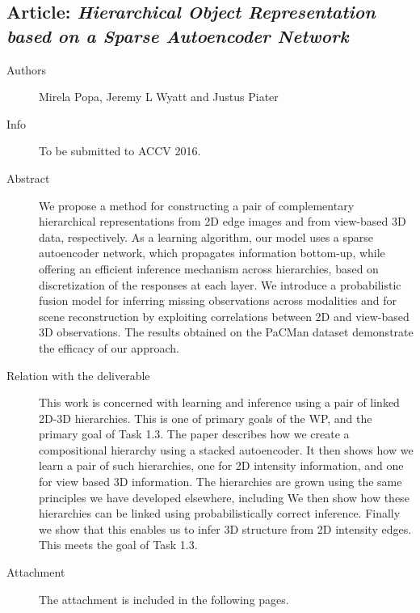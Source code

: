 \documentclass[a4paper,11pt,pdf]{../templates/pacmanreport}
\begin{document}
\subsection{Article: \em Hierarchical Object Representation based on a Sparse Autoencoder Network}
\begin{description}
    \item[Authors] Mirela Popa, Jeremy L Wyatt and Justus Piater
    \item[Info] To be submitted to ACCV 2016.
    \item[Abstract] We propose a method for constructing a pair of complementary
hierarchical representations from 2D edge images and from view-based 3D
data, respectively.  As a learning algorithm, our model uses a sparse
autoencoder network, which propagates information bottom-up, while
offering an efficient inference mechanism across hierarchies, based on
discretization of the responses at each layer.  We introduce a
probabilistic fusion model for inferring missing observations across
modalities and for scene reconstruction by exploiting correlations
between 2D and view-based 3D observations. The results obtained on the
PaCMan dataset demonstrate the efficacy of our approach.
    \item [Relation with the deliverable] This work is concerned with learning and inference using a pair of linked 2D-3D hierarchies. This is one of primary goals of the WP, and the primary goal of Task 1.3. The paper describes how we create a compositional hierarchy using a stacked autoencoder. It then shows how we learn a pair of such hierarchies, one for 2D intensity information, and one for view based 3D information. The hierarchies are grown using the same principles we have developed elsewhere, including We then show how these hierarchies can be linked using probabilistically correct inference. Finally we show that this enables us to infer 3D structure from 2D intensity edges. This meets the goal of Task 1.3.
    
    \item[Attachment] The attachment is included in the following pages.
\end{description}
%

\newpage
\end{document}

